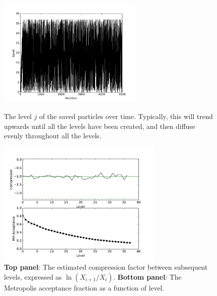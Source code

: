 \documentclass[article, nojss]{jss}
\begin{document}
\begin{figure}[ht!]
\begin{minipage}{7.5cm}
\centering
\includegraphics[width=7cm]{figures/fig1.pdf}
\caption{The level $j$ of the saved particles over time.
Typically, this will trend upwards until all the levels have
been created, and then diffuse evenly throughout all the levels.
\label{fig:fig1}}
\end{minipage}\hspace{0.5cm}
\begin{minipage}{7.5cm}
\centering
\includegraphics[width=8cm]{figures/fig2.pdf}
\caption{{\bf Top panel}: The estimated compression factor between subsequent
levels, expressed as $\ln(X_{i+1}/X_{i})$. {\bf Bottom panel}:
The Metropolis acceptance fraction as a function of level.
\label{fig:fig2}}
\end{minipage}
\end{figure}
\end{document}
